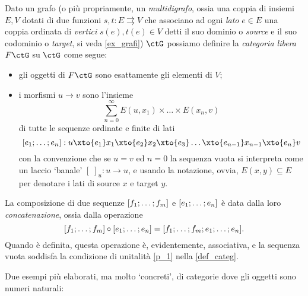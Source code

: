 \begin{example}\label{ex_cat_libera}
	Dato un grafo (o più propriamente, un \emph{multidigrafo}, ossia una coppia di insiemi \(E,V\) dotati di due funzioni \(s,t : E\rightrightarrows V\) che associano ad ogni \emph{lato} \(e\in E\) una coppia ordinata di \emph{vertici} \(s(e),t(e)\in V\) detti il suo dominio o \emph{source} e il suo codominio o \emph{target}, si veda \ref{ex_grafi}) \(\ctG\) possiamo definire la \emph{categoria libera} \(F\ctG\) su \(\ctG\) come segue:
	\begin{itemize}
		\item gli oggetti di \(F\ctG\) sono esattamente gli elementi di \(V\);
		\item i morfismi \(u\to v\) sono l'insieme
		      \[\sum_{n=0}^\infty E(u,x_1)\times\dots\times E(x_n,v)\]
		      di tutte le sequenze ordinate e finite di lati
		      \[ [\tup en;] : u \xto{e_1} x_1 \xto{e_2} x_2\xto{e_3} \dots\xto{e_{n-1}} x_{n-1}\xto{e_n} v\]
		      con la convenzione che se \(u=v\) ed \(n=0\) la sequenza vuota si interpreta come un laccio `banale' \([\;]_u : u\to u\), e usando la notazione, ovvia, \(E(x,y)\subseteq E\) per denotare i lati di source \(x\) e target \(y\).
	\end{itemize}
	La composizione di due sequenze \([\tup fm;]\) e \([\tup en;]\) è data dalla loro \emph{concatenazione}, ossia dalla operazione
	\[[\tup fm;]\circ[\tup en;] = [\tup fm;;\tup en;].\]
	Quando è definita, questa operazione è, evidentemente, associativa, e la sequenza vuota soddisfa la condizione di unitalità \ref{p_1} nella \ref{def_categ}.
\end{example}
Due esempi più elaborati, ma molto `concreti', di categorie dove gli oggetti sono numeri naturali:
